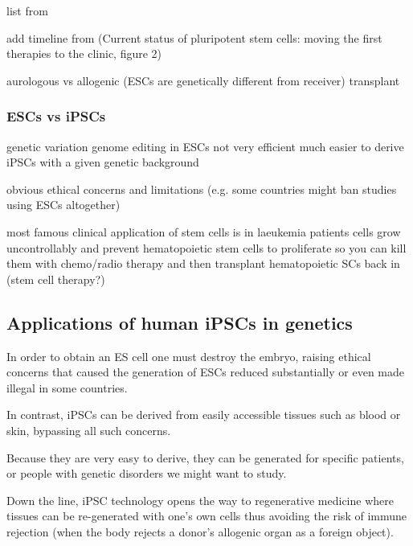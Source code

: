list from \cite{mahla2016stem}


add timeline from (Current status of pluripotent stem cells: moving the first therapies to the clinic,  figure 2)

\cite{kimbrel2015current}

aurologous vs allogenic (ESCs are genetically different from receiver) transplant

\subsubsection{ESCs vs iPSCs}

genetic variation
genome editing in ESCs not very efficient
much easier to derive iPSCs with a given genetic background

obvious ethical concerns and limitations (e.g. some countries might ban studies using ESCs altogether)

most famous clinical application of stem cells is in laeukemia patients
cells grow uncontrollably and prevent hematopoietic stem cells to proliferate so you can kill them with chemo/radio therapy and then transplant hematopoietic SCs back in (stem cell therapy?)



\subsection{Applications of human iPSCs in genetics}

In order to obtain an ES cell one must destroy the embryo, raising ethical concerns that caused the generation of ESCs reduced substantially or even made illegal in some countries.

In contrast, iPSCs can be derived from easily accessible tissues such as blood or skin, bypassing all such concerns.

Because they are very easy to derive, they can be generated for specific patients, or people with genetic disorders we might want to study.

Down the line, iPSC technology opens the way to regenerative medicine where tissues can be re-generated with one's own cells thus avoiding the risk of immune rejection (when the body rejects a donor's allogenic organ as a foreign object).

